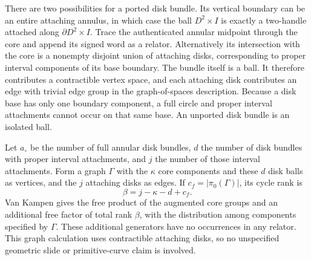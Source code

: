 There are two possibilities for a ported disk bundle.  Its vertical
boundary can be an entire attaching annulus, in which case the ball
$D^2\times I$ is exactly a two-handle attached along $\partial D^2\times I$.
Trace the authenticated annular midpoint through the core and append its
signed word as a relator.  Alternatively its intersection with the core
is a nonempty disjoint union of attaching disks, corresponding to proper
interval components of its base boundary.  The bundle itself is a ball.
It therefore contributes a contractible vertex space, and each attaching
disk contributes an edge with trivial edge group in the graph-of-spaces
description.  Because a disk base has only one boundary component, a
full circle and proper interval attachments cannot occur on that same
base.  An unported disk bundle is an isolated ball.

Let $a_\circ$ be the number of full annular disk bundles, $d$ the number
of disk bundles with proper interval attachments, and $j$ the number of
those interval attachments.  Form a graph $\Gamma$ with the $\kappa$
core components and these $d$ disk balls as vertices, and the $j$
attaching disks as edges.  If $c_f=|\pi_0(\Gamma)|$, its cycle rank is
\[
 \beta=j-\kappa-d+c_f.
\]
Van Kampen gives the free product of the augmented core groups and an
additional free factor of total rank $\beta$, with the distribution
among components specified by $\Gamma$.  These additional generators
have no occurrences in any relator.  This graph calculation uses
contractible attaching disks, so no unspecified geometric slide or
primitive-curve claim is involved.

